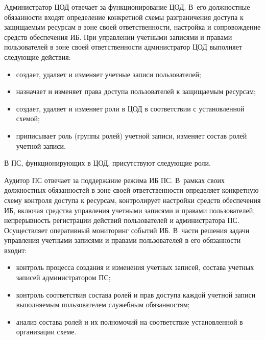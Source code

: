 \begin{multicols}{2}
       Администратор ЦОД отвечает за функционирование ЦОД. В~его должностные 
обязанности входят определение конкретной схемы разграничения доступа к 
защищаемым ресурсам в зоне своей ответственности, настройка и сопровождение средств 
обеспечения ИБ. При управлении учетными записями и правами пользователей в зоне 
своей ответственности администратор ЦОД выполняет следующие действия: 
       \begin{itemize}
\item создает, удаляет и изменяет учетные записи пользователей;\\[-14pt] 
\item назначает и изменяет права доступа пользователей к защищаемым ресурсам;\\[-14pt] 
\item создает, удаляет и изменяет роли в ЦОД в соответствии с уста\-нов\-лен\-ной схемой;\\[-14pt]
\item приписывает роль (группы ролей) учетной записи, изменяет состав ролей 
учетной записи.
\end{itemize}

       В ПС, функционирующих в ЦОД, присутствуют следующие роли.
       \pagebreak
       
       Аудитор ПС отвечает за поддержание режима ИБ ПС. В~рамках своих 
должностных обязанностей в зоне своей ответственности определяет конкретную схему 
контроля доступа к ресурсам, контролирует настройки средств обеспечения ИБ, включая 
средства управления учетными записями и правами пользователей, непрерывность 
регистрации действий пользователей и администратора ПС. Осуществляет оперативный 
мониторинг событий ИБ. В~части решения задачи управления учетными записями и 
правами пользователей в его обязанности входит: 
       \begin{itemize}
\item контроль процесса создания и изменения учетных записей, состава учетных 
записей администратором ПС; 
\item контроль соответствия состава ролей и прав доступа каждой учетной записи 
выполняемым пользователем служебным обязанностям; 
\item анализ состава ролей и их полномочий на соответствие уста\-нов\-лен\-ной в 
организации схеме.
\end{itemize}
       

\end{multicols}
